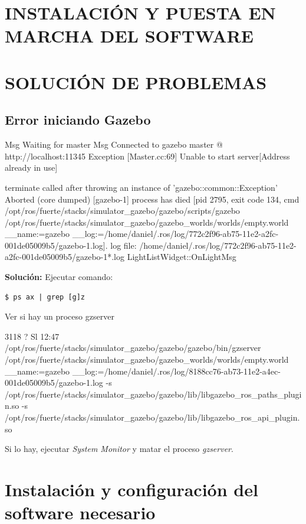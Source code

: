 \documentclass[10pt,a4paper]{report}
\begin{document}
\chapter{INSTALACIÓN Y PUESTA EN MARCHA DEL SOFTWARE}

\chapter{SOLUCIÓN DE PROBLEMAS}

\section{Error iniciando Gazebo}

\begin{spverbatim}
Msg Waiting for master
Msg Connected to gazebo master @ http://localhost:11345
Exception [Master.cc:69] Unable to start server[Address already in use]


terminate called after throwing an instance of 'gazebo::common::Exception'
Aborted (core dumped)
[gazebo-1] process has died [pid 2795, exit code 134, cmd /opt/ros/fuerte/stacks/simulator_gazebo/gazebo/scripts/gazebo /opt/ros/fuerte/stacks/simulator_gazebo/gazebo_worlds/worlds/empty.world __name:=gazebo __log:=/home/daniel/.ros/log/772c2f96-ab75-11e2-a2fc-001de05009b5/gazebo-1.log].
log file: /home/daniel/.ros/log/772c2f96-ab75-11e2-a2fc-001de05009b5/gazebo-1*.log
LightListWidget::OnLightMsg
\end{spverbatim}

\textbf{Solución: }
Ejecutar comando:
\begin{verbatim}
$ ps ax | grep [g]z
\end{verbatim}

Ver si hay un proceso gzserver

\begin{spverbatim}
 3118 ?        Sl    12:47
 /opt/ros/fuerte/stacks/simulator_gazebo/gazebo/gazebo/bin/gzserver 
 /opt/ros/fuerte/stacks/simulator_gazebo/gazebo_worlds/worlds/empty.world __name:=gazebo __log:=/home/daniel/.ros/log/8188cc76-ab73-11e2-a4ec-001de05009b5/gazebo-1.log -s /opt/ros/fuerte/stacks/simulator_gazebo/gazebo/lib/libgazebo_ros_paths_plugin.so -s /opt/ros/fuerte/stacks/simulator_gazebo/gazebo/lib/libgazebo_ros_api_plugin.so
\end{spverbatim}

Si lo hay, ejecutar \textit{System Monitor} y matar el proceso \textit{gzserver}.

\chapter{Instalación y configuración del software necesario}
\end{document}
